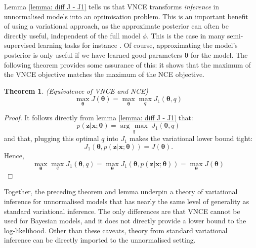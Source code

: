 \documentclass[11pt, oneside]{article}
\newcommand{\thetab}{{\boldsymbol{\theta}}}
\newcommand{\pnn}{\phi}
\newcommand{\x}{{\mathbf x}}
\newcommand{\z}{{\mathbf z}}
\newtheorem{theorem}{Theorem}
\theoremstyle{definition}
\newcommand{\argmax}[1]{\underset{#1}{\operatorname{arg}\,\operatorname{max}}\;}
\begin{document}
Lemma \ref{lemma: diff J - J1} tells us that VNCE transforms \emph{inference} in unnormalised models into an optimisation problem. This is an important benefit of using a variational approach, as the approximate posterior can often be directly useful, independent of the full model $\pnn$. This is the case in many semi-supervised learning tasks for instance \citep{kingma2014semi}. Of course, approximating the model's posterior is only useful if we have learned good parameters $\thetab$ for the model. The following theorem provides some assurance of this: it shows that the maximum of the VNCE objective matches the maximum of the NCE objective.
\begin{theorem}{(Equivalence of VNCE and NCE)}
\label{theorem: equivalece of vnce and nce}
\begin{equation}
    \max_{\thetab} J(\thetab) = \max_{\thetab} \max_{q} J_1(\thetab, q)
\end{equation}
\end{theorem}
\begin{proof}
It follows directly from lemma \ref{lemma: diff J - J1} that:
\begin{equation}
    p(\z | \x ; \thetab) = \argmax{q} J_1(\thetab, q)
\end{equation}
and that, plugging this optimal $q$ into $J_1$ makes the variational lower bound tight:
\begin{equation}
    J_1(\thetab, p(\z | \x ;\thetab)) = J(\thetab).
\end{equation}
Hence,
\begin{equation}
    \max_{\thetab} \max_{q} J_1(\thetab, q) = \max_{\thetab} J_1(\thetab, p(\z | \x ;\thetab)) =  \max_{\thetab} J(\thetab)
\end{equation}
\end{proof}
Together, the preceding theorem and lemma underpin a theory of variational inference for unnormalised models that has nearly the same level of generality as standard variational inference. The only differences are that VNCE cannot be used for Bayesian models, and it does not directly provide a lower bound to the log-likelihood. Other than these caveats, theory from standard variational inference can be directly imported to the unnormalised setting.
\end{document}
